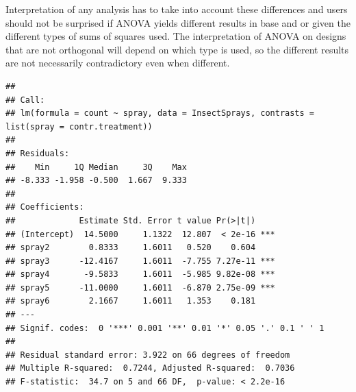 \documentclass[krantz2]{krantz}\usepackage{knitr}
\begin{document}
\begin{warningbox}
Interpretation of any analysis has to take into account these differences and users should not be surprised if ANOVA yields different results in base \Rlang and  or  given the different types of sums of squares used. The interpretation of ANOVA on designs that are not orthogonal will depend on which type is used, so the different results are not necessarily contradictory even when different.

\begin{knitrout}\footnotesize
{}\color{fgcolor}\begin{kframe}
\begin{alltt}
\end{alltt}
\begin{verbatim}
## 
## Call:
## lm(formula = count ~ spray, data = InsectSprays, contrasts = list(spray = contr.treatment))
## 
## Residuals:
##    Min     1Q Median     3Q    Max 
## -8.333 -1.958 -0.500  1.667  9.333 
## 
## Coefficients:
##             Estimate Std. Error t value Pr(>|t|)    
## (Intercept)  14.5000     1.1322  12.807  < 2e-16 ***
## spray2        0.8333     1.6011   0.520    0.604    
## spray3      -12.4167     1.6011  -7.755 7.27e-11 ***
## spray4       -9.5833     1.6011  -5.985 9.82e-08 ***
## spray5      -11.0000     1.6011  -6.870 2.75e-09 ***
## spray6        2.1667     1.6011   1.353    0.181    
## ---
## Signif. codes:  0 '***' 0.001 '**' 0.01 '*' 0.05 '.' 0.1 ' ' 1
## 
## Residual standard error: 3.922 on 66 degrees of freedom
## Multiple R-squared:  0.7244,	Adjusted R-squared:  0.7036 
## F-statistic:  34.7 on 5 and 66 DF,  p-value: < 2.2e-16
\end{verbatim}
\end{kframe}
\end{knitrout}


\end{warningbox}
\end{document}
